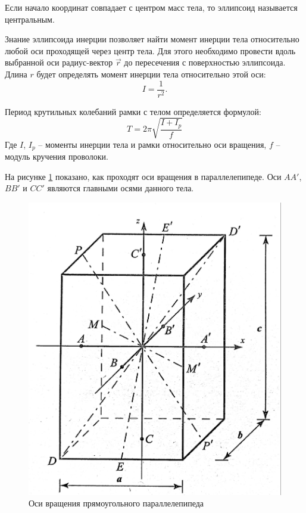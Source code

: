 \documentclass[a4paper, 12pt]{article}
\begin{document}
Если начало координат совпадает с центром масс тела, то эллипсоид называется центральным.

Знание эллипсоида инерции позволяет найти момент инерции тела относительно любой оси проходящей через центр тела. Для этого необходимо провести вдоль выбранной оси радиус-вектор $\overrightarrow{r}$ до пересечения с поверхностью эллипсоида. Длина $r$ будет определять момент инерции тела относительно этой оси:
\begin{equation}
    I = \frac{1}{r^2}.
\end{equation}

Период крутильных колебаний рамки с телом определяется формулой:
\begin{equation}
    T = 2\pi\sqrt{\frac{I+I_p}{f}}
    \label{eq:period}
\end{equation} 
Где $I$, $I_p$ -- моменты инерции тела и рамки относительно оси вращения, $f$ -- модуль кручения проволоки.

На рисунке \ref{pic:parallelepiped} показано, как проходят оси вращения в параллелепипеде. Оси $AA'$, $BB'$ и $CC'$ являются главными осями данного тела.

\begin{figure}
	\includegraphics[width=\linewidth]{parallelepiped.jpg}
	\caption{Оси вращения прямоугольного параллелепипеда}
    \label{pic:parallelepiped}
\end{figure}
\end{document}
